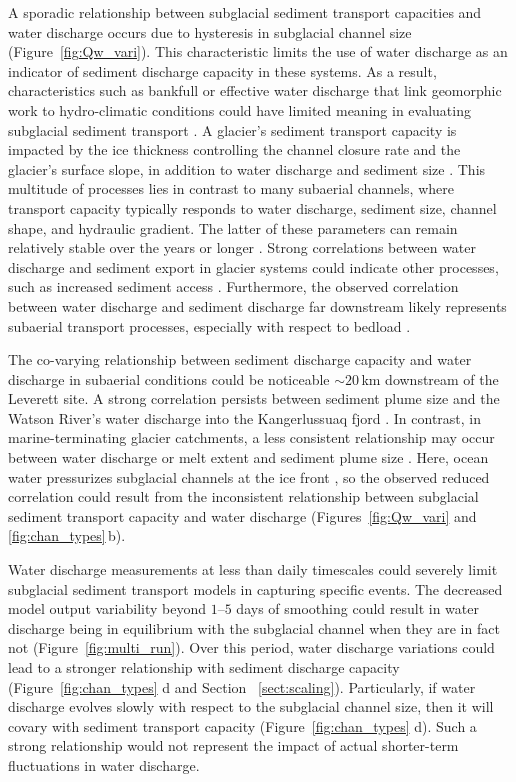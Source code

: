 \documentclass[tc, manuscript]{copernicus}
\begin{document}
A sporadic relationship between subglacial sediment transport capacities and water discharge occurs due to hysteresis in subglacial channel size (Figure~\ref{fig:Qw_vari}).
This characteristic limits the use of water discharge as an indicator of sediment discharge capacity in these systems.
As a result, characteristics such as bankfull or effective water discharge that link geomorphic work to hydro-climatic conditions could have limited meaning in evaluating subglacial sediment transport \citep{wolman1960,lenzi2006}.
A glacier's sediment transport capacity is impacted by the ice thickness controlling the channel closure rate and the glacier's surface slope, in addition to water discharge and sediment size \citep[Figure~\ref{fig:multi_run}, Section~\ref{sect:sub_mode}; ][]{rothlisberger1972,gimbert2016,stevens2022,walder1994}.
This multitude of processes lies in contrast to many subaerial channels, where transport capacity typically responds to water discharge, sediment size, channel shape,  and hydraulic gradient.
The latter of these parameters can remain relatively stable over the years or longer \citep[Section~\ref{sect:fluv}; e.g.][]{tucker1997}.
Strong correlations between water discharge and sediment export in glacier systems could indicate other processes, such as increased sediment access \citep{zhang2022}.
Furthermore, the observed correlation between water discharge and sediment discharge far downstream likely represents subaerial transport processes, especially with respect to bedload \citep{mancini2023}.

The co-varying relationship between sediment discharge capacity and water discharge in subaerial conditions could be noticeable $\sim20$\,\unit{km} downstream of the Leverett site.
A strong correlation persists between sediment plume size and the Watson River's water discharge into the Kangerlussuaq fjord \citep[Figure~\ref{fig:chan_types}\,c; ][]{chu2009,mcgrath2010}.
In contrast, in marine-terminating glacier catchments, a less consistent relationship may occur between water discharge or melt extent and sediment plume size \citep{chu2012,tedstone2012}.
Here, ocean water pressurizes subglacial channels at the ice front \citep[e.g.][]{how2017}, so the observed reduced correlation could result from the inconsistent relationship between subglacial sediment transport capacity and water discharge (Figures~\ref{fig:Qw_vari} and \ref{fig:chan_types}\,b).

Water discharge measurements at less than daily timescales could severely limit subglacial sediment transport models in capturing specific events.
The decreased model output variability beyond $1$--$5$ days of smoothing could result in water discharge being in equilibrium with the subglacial channel when they are in fact not (Figure~\ref{fig:multi_run}).
Over this period, water discharge variations could lead to a stronger relationship with sediment discharge capacity (Figure~\ref{fig:chan_types} d and Section ~\ref{sect:scaling}).
Particularly, if water discharge evolves slowly with respect to the subglacial channel size, then it will covary with sediment transport capacity (Figure~\ref{fig:chan_types} d).
Such a strong relationship would not represent the impact of actual shorter-term fluctuations in water discharge.
\end{document}
